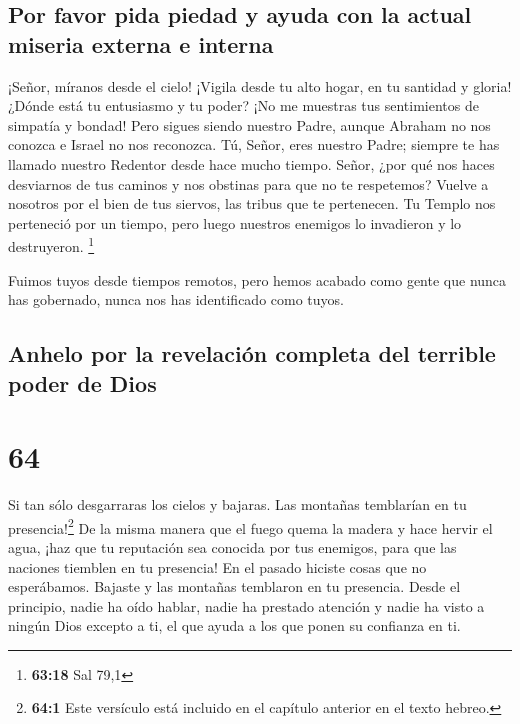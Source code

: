 \hypertarget{por-favor-pida-piedad-y-ayuda-con-la-actual-miseria-externa-e-interna}{%
\subsection{Por favor pida piedad y ayuda con la actual miseria externa
e
interna}\label{por-favor-pida-piedad-y-ayuda-con-la-actual-miseria-externa-e-interna}}

 ¡Señor, míranos desde el cielo! ¡Vigila desde tu alto
hogar, en tu santidad y gloria! ¿Dónde está tu entusiasmo y tu poder?
¡No me muestras tus sentimientos de simpatía y bondad! 
Pero sigues siendo nuestro Padre, aunque Abraham no nos conozca e Israel
no nos reconozca. Tú, Señor, eres nuestro Padre; siempre te has llamado
nuestro Redentor desde hace mucho tiempo.  Señor, ¿por
qué nos haces desviarnos de tus caminos y nos obstinas para que no te
respetemos? Vuelve a nosotros por el bien de tus siervos, las tribus que
te pertenecen.  Tu Templo nos perteneció por un tiempo,
pero luego nuestros enemigos lo invadieron y lo destruyeron. \footnote{\textbf{63:18}
  Sal 79,1}

 Fuimos tuyos desde tiempos remotos, pero hemos acabado
como gente que nunca has gobernado, nunca nos has identificado como
tuyos.

\hypertarget{anhelo-por-la-revelaciuxf3n-completa-del-terrible-poder-de-dios}{%
\subsection{Anhelo por la revelación completa del terrible poder de
Dios}\label{anhelo-por-la-revelaciuxf3n-completa-del-terrible-poder-de-dios}}

\hypertarget{section-63}{%
\section{64}\label{section-63}}

 Si tan sólo desgarraras los cielos y bajaras. Las
montañas temblarían en tu presencia!\footnote{\textbf{64:1} Este
  versículo está incluido en el capítulo anterior en el texto hebreo.}
 De la misma manera que el fuego quema la madera y hace
hervir el agua, ¡haz que tu reputación sea conocida por tus enemigos,
para que las naciones tiemblen en tu presencia!  En el
pasado hiciste cosas que no esperábamos. Bajaste y las montañas
temblaron en tu presencia.  Desde el principio, nadie ha
oído hablar, nadie ha prestado atención y nadie ha visto a ningún Dios
excepto a ti, el que ayuda a los que ponen su confianza en ti.

